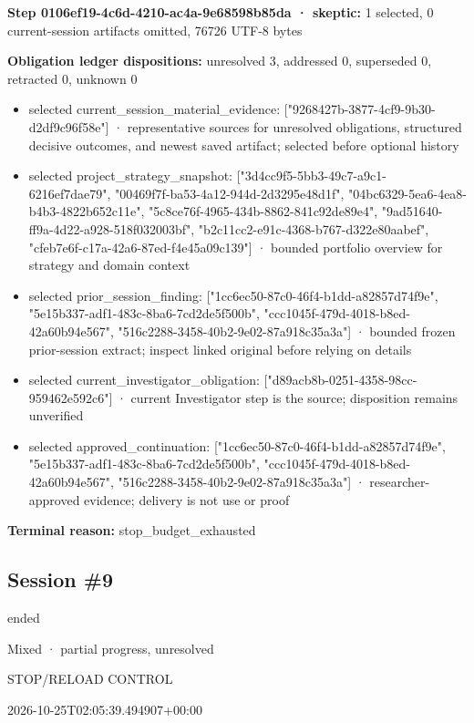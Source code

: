 \documentclass[11pt]{article}
\begin{document}
\textbf{Step 0106ef19-4c6d-4210-ac4a-9e68598b85da · skeptic:} 1 selected, 0 current-session artifacts omitted, 76726 UTF-8 bytes\par
\textbf{Obligation ledger dispositions:} unresolved 3, addressed 0, superseded 0, retracted 0, unknown 0\par
\begin{itemize}
\item selected current\_session\_material\_evidence: ["9268427b-3877-4cf9-9b30-d2df9c96f58e"] · representative sources for unresolved obligations, structured decisive outcomes, and newest saved artifact; selected before optional history
\item selected project\_strategy\_snapshot: ["3d4cc9f5-5bb3-49c7-a9c1-6216ef7dae79", "00469f7f-ba53-4a12-944d-2d3295e48d1f", "04bc6329-5ea6-4ea8-b4b3-4822b652c11e", "5c8ce76f-4965-434b-8862-841c92de89e4", "9ad51640-ff9a-4d22-a928-518f032003bf", "b2c11cc2-e91c-4368-b767-d322e80aabef", "cfeb7e6f-c17a-42a6-87ed-f4e45a09c139"] · bounded portfolio overview for strategy and domain context
\item selected prior\_session\_finding: ["1cc6ec50-87c0-46f4-b1dd-a82857d74f9e", "5e15b337-adf1-483c-8ba6-7cd2de5f500b", "ccc1045f-479d-4018-b8ed-42a60b94e567", "516c2288-3458-40b2-9e02-87a918c35a3a"] · bounded frozen prior-session extract; inspect linked original before relying on details
\item selected current\_investigator\_obligation: ["d89acb8b-0251-4358-98cc-959462e592c6"] · current Investigator step is the source; disposition remains unverified
\item selected approved\_continuation: ["1cc6ec50-87c0-46f4-b1dd-a82857d74f9e", "5e15b337-adf1-483c-8ba6-7cd2de5f500b", "ccc1045f-479d-4018-b8ed-42a60b94e567", "516c2288-3458-40b2-9e02-87a918c35a3a"] · researcher-approved evidence; delivery is not use or proof
\end{itemize}
\textbf{Terminal reason:} stop\_budget\_exhausted\par
\subsection{Session \#9}
\begin{description}[style=nextline,font=\normalfont\bfseries,leftmargin=0pt,labelsep=0pt]
\item[Execution status] ended
\item[Outcome] Mixed · partial progress, unresolved
\item[Strategy] STOP/RELOAD CONTROL
\item[Started] 2026-10-25T02:05:39.494907+00:00
\end{description}
\end{document}
